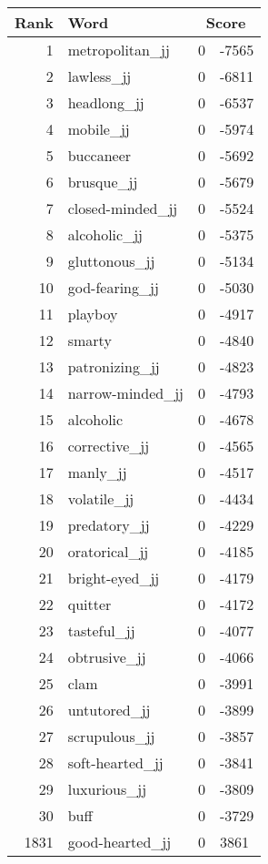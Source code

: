 \begin{longtable}[!htbp]{| rlr@{.}l |}
    \hline
    \textbf{Rank} & \textbf{Word} & \multicolumn{2}{c|}{\textbf{Score}} \\
    \hline
    \endhead
    1 & metropolitan\_jj & 0 & -7565 \\
    2 & lawless\_jj & 0 & -6811 \\
    3 & headlong\_jj & 0 & -6537 \\
    4 & mobile\_jj & 0 & -5974 \\
    5 & buccaneer & 0 & -5692 \\
    6 & brusque\_jj & 0 & -5679 \\
    7 & closed-minded\_jj & 0 & -5524 \\
    8 & alcoholic\_jj & 0 & -5375 \\
    9 & gluttonous\_jj & 0 & -5134 \\
    10 & god-fearing\_jj & 0 & -5030 \\
    11 & playboy & 0 & -4917 \\
    12 & smarty & 0 & -4840 \\
    13 & patronizing\_jj & 0 & -4823 \\
    14 & narrow-minded\_jj & 0 & -4793 \\
    15 & alcoholic & 0 & -4678 \\
    16 & corrective\_jj & 0 & -4565 \\
    17 & manly\_jj & 0 & -4517 \\
    18 & volatile\_jj & 0 & -4434 \\
    19 & predatory\_jj & 0 & -4229 \\
    20 & oratorical\_jj & 0 & -4185 \\
    21 & bright-eyed\_jj & 0 & -4179 \\
    22 & quitter & 0 & -4172 \\
    23 & tasteful\_jj & 0 & -4077 \\
    24 & obtrusive\_jj & 0 & -4066 \\
    25 & clam & 0 & -3991 \\
    26 & untutored\_jj & 0 & -3899 \\
    27 & scrupulous\_jj & 0 & -3857 \\
    28 & soft-hearted\_jj & 0 & -3841 \\
    29 & luxurious\_jj & 0 & -3809 \\
    30 & buff & 0 & -3729 \\
    1831 & good-hearted\_jj & 0 & 3861 \\

\end{longtable}
